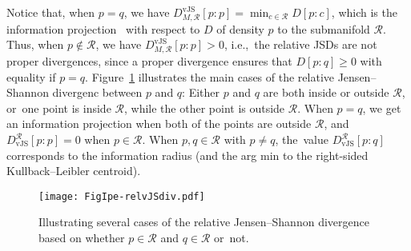 \documentclass[entropy,article,accept,oneauthor,pdftex,entropy]{Definitions/mdpi}
\def\vJS{\mathrm{vJS}}
\def\calR{\mathcal{R}}
\begin{document}
\begin{paracol}{2}
Notice that, when $p=q$, we have $D^\vJS_{M,\calR}[p:p]=\min_{c\in\calR} D[p:c]$, which is the  information projection~\cite{InfProj-2018} with respect to $D$ of density $p$ to the submanifold $\calR$. Thus, when $p\not\in\calR$, we have $D^\vJS_{M,\calR}[p:p]>0$, i.e.,~the relative JSDs are not proper divergences, since a proper divergence ensures that $D[p:q]\geq 0$ with equality if $p=q$.
Figure~\ref{fig:relJS} illustrates the main cases of the relative Jensen--Shannon divergenc between $p$ and $q$:
Either $p$ and $q$ are both inside or outside $\calR$, or~one point is inside $\calR$, while the other point is outside $\calR$.
When $p=q$, we get an information projection when both of the points are outside $\calR$, and~
$D_\vJS^\calR[p:p]=0$ when $p\in\calR$. When $p,q\in\calR$ with $p\not=q$, the~value $D_\vJS^\calR[p:q]$ corresponds to the information radius (and the arg min to the right-sided Kullback--Leibler centroid).

\clearpage
\end{paracol}
\nointerlineskip
\begin{figure}[H]
\widefigure
\texttt{[image: FigIpe-relvJSdiv.pdf]}

\caption{Illustrating several cases of the relative Jensen--Shannon divergence based on whether $p\in\calR$ and $q\in\calR$ or~not.\label{fig:relJS}}
\end{figure}
\end{document}
